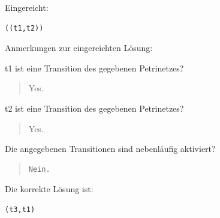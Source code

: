 Eingereicht:


\begin{verbatim}
((t1,t2))
\end{verbatim}


Anmerkungen zur eingereichten Lösung:

t1 ist eine Transition des gegebenen Petrinetzes?\begin{quote}Yes.\end{quote}t2 ist eine Transition des gegebenen Petrinetzes?\begin{quote}Yes.\end{quote}Die angegebenen Transitionen sind nebenläufig aktiviert?

\begin{quote}
\begin{verbatim}
Nein.
\end{verbatim}
\end{quote}

Die korrekte Lösung ist:
\begin{verbatim}
(t3,t1)
\end{verbatim}


